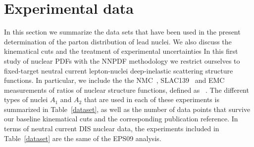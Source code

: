 
\section{Experimental data}

In this section we summarize the data sets that have been used
in the present determination of the parton distribution of lead nuclei.
%
We also discuss the kinematical cuts and the  treatment of experimental
uncertainties
%
In this first study of nuclear PDFs with the NNPDF methodology
we restrict ourselves to fixed-target neutral current lepton-nuclei
deep-inelastic scattering structure functions.
%
In particular, we include the the
NMC~\cite{Amaudruz:1995tq,Arneodo:1995cs,Arneodo:1996rv,Arneodo:1996ru}, SLAC139~\cite{PhysRevD.49.4348} and EMC~\cite{Ashman:1992kv}
measurements of ratios of nuclear structure functions, defined
as
\be
\label{eqratio}
 \, .
\ee
The different types of nuclei $A_1$ and $A_2$ that are used in each
of these experiments is summarized in  Table~\ref{dataset}, as well
as the number of data points that survive our baseline kinematical
cuts and the corresponding publication reference.
%
In terms of neutral current DIS nuclear data, the experiments included
in Table~\ref{dataset} are the same of the EPS09 analysis.


